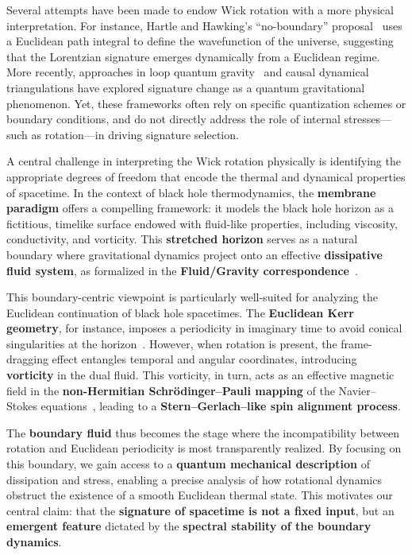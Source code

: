 \documentclass[11pt]{article}
\begin{document}
Several attempts have been made to endow Wick rotation with a more physical interpretation. For instance, Hartle and Hawking's ``no-boundary'' proposal~\cite{HartleHawking1983} uses a Euclidean path integral to define the wavefunction of the universe, suggesting that the Lorentzian signature emerges dynamically from a Euclidean regime. More recently, approaches in loop quantum gravity~\cite{BojowaladBrahma2016} and causal dynamical triangulations have explored signature change as a quantum gravitational phenomenon. Yet, these frameworks often rely on specific quantization schemes or boundary conditions, and do not directly address the role of internal stresses---such as rotation---in driving signature selection.

A central challenge in interpreting the Wick rotation physically is identifying the appropriate degrees of freedom that encode the thermal and dynamical properties of spacetime. In the context of black hole thermodynamics, the \textbf{membrane paradigm} offers a compelling framework: it models the black hole horizon as a fictitious, timelike surface endowed with fluid-like properties, including viscosity, conductivity, and vorticity. This \textbf{stretched horizon} serves as a natural boundary where gravitational dynamics project onto an effective \textbf{dissipative fluid system}, as formalized in the \textbf{Fluid/Gravity correspondence}~\cite{FluidGravity2008}.

This boundary-centric viewpoint is particularly well-suited for analyzing the Euclidean continuation of black hole spacetimes. The \textbf{Euclidean Kerr geometry}, for instance, imposes a periodicity in imaginary time to avoid conical singularities at the horizon~\cite{GibbonsHawking1977}. However, when rotation is present, the frame-dragging effect entangles temporal and angular coordinates, introducing \textbf{vorticity} in the dual fluid. This vorticity, in turn, acts as an effective magnetic field in the \textbf{non-Hermitian Schr\"odinger--Pauli mapping} of the Navier--Stokes equations~\cite{MengYang2024}, leading to a \textbf{Stern--Gerlach--like spin alignment process}.

The \textbf{boundary fluid} thus becomes the stage where the incompatibility between rotation and Euclidean periodicity is most transparently realized. By focusing on this boundary, we gain access to a \textbf{quantum mechanical description} of dissipation and stress, enabling a precise analysis of how rotational dynamics obstruct the existence of a smooth Euclidean thermal state. This motivates our central claim: that the \textbf{signature of spacetime is not a fixed input}, but an \textbf{emergent feature} dictated by the \textbf{spectral stability of the boundary dynamics}.
\end{document}
